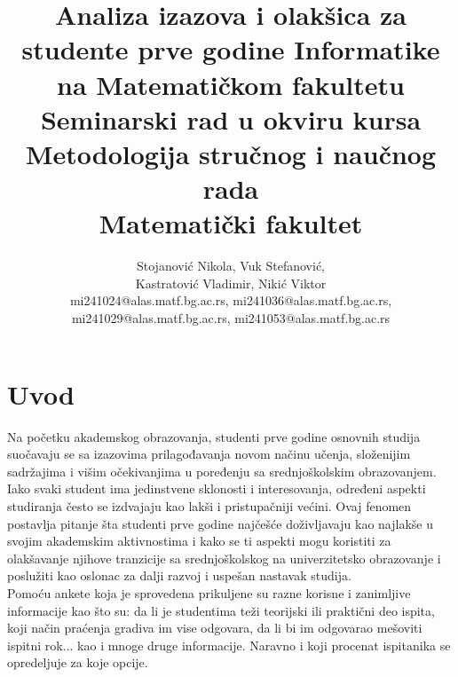 \documentclass[a4paper]{article}
\begin{document}
\title{Analiza izazova i olakšica za studente prve godine Informatike na  Matematičkom fakultetu\\ \small{Seminarski rad u okviru kursa\\Metodologija stručnog i naučnog rada\\ Matematički fakultet}}

\author{Stojanović Nikola, Vuk Stefanović, \\Kastratović Vladimir, Nikić Viktor\\
mi241024@alas.matf.bg.ac.rs, mi241036@alas.matf.bg.ac.rs, \\mi241029@alas.matf.bg.ac.rs, mi241053@alas.matf.bg.ac.rs }


\maketitle



\tableofcontents



\section{Uvod}
\label{sec:uvod}

Na početku akademskog obrazovanja, studenti prve godine osnovnih studija suočavaju se sa izazovima prilagođavanja novom načinu učenja, složenijim sadržajima i višim očekivanjima u poređenju sa srednjoškolskim obrazovanjem. Iako svaki student ima jedinstvene sklonosti i interesovanja, određeni aspekti studiranja često se izdvajaju kao lakši i pristupačniji većini. Ovaj fenomen postavlja pitanje šta studenti prve godine najčešće doživljavaju kao najlakše u svojim akademskim aktivnostima i kako se ti aspekti mogu koristiti za olakšavanje njihove tranzicije sa srednjoškolskog na univerzitetsko obrazovanje i poslužiti kao oslonac za dalji razvoj i uspešan nastavak studija.\\

Pomoću ankete koja je sprovedena prikuljene su razne korisne i zanimljive informacije kao što su: da li je studentima teži teorijski ili praktični deo ispita, koji način praćenja gradiva im vise odgovara, da li bi im odgovarao mešoviti ispitni rok... kao i mnoge druge informacije. Naravno i koji procenat ispitanika se opredeljuje za koje opcije. \\
\end{document}
